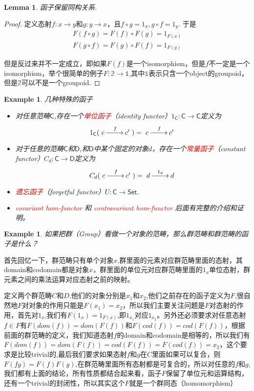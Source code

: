 \documentclass{article}
\newtheorem{lemma}[theorem]{Lemma}
\newtheorem{example}[theorem]{Example}
\newcommand*{\cat}[1]{\textsf{#1}\xspace}
\newcommand{\id}{1}
\newcommand*{\xfunc}[4]{{#2}\colon{#3}{#1}{#4}}
\newcommand*{\func}[3]{\xfunc{\to}{#1}{#2}{#3}}
\newcommand{\redt}[1]{\textcolor{red}{#1}}
\begin{document}
\begin{lemma}
\rm 函子保留同构关系.
\end{lemma}

\begin{proof}
定义态射$\func{f}{x}{y}$和$\func{g}{y}{x}$，且$f \circ g = 1_x,g \circ f=1_y$. 于是
$$
\begin{aligned}
F(f \circ g)=F(f) \circ F(g)= 1_{F(x)} \\
F(g \circ f)=F(g) \circ F(f)= 1_{F(y)}
\end{aligned}
$$

但是反过来并不一定成立，即如果$F(f)$是一个isomorphism，但是$f$不一定是一个isomorphism，举个很简单的例子$\func{F}{\mathbb{2}}{\mathbb{1}}$,其中$\mathbb{1}$表示只含一个object的groupoid，但是$\mathbb{2}$可以不是一个groupoid.
\end{proof}

\begin{example}
\rm 几种特殊的函子
	\begin{itemize}
		\item 对任意范畴$\cat{C}$,存在一个\redt{单位函子}（identity functor）$\func{\id_{\cat{C}}}{\cat{C}}{\cat{C}}$定义为\[\id_{\cat{C}}(\xymatrix{c\ar[r]^f&c'})=\xymatrix{c\ar[r]^f&c'}\]
		\item 对于任意的范畴$\cat{C}$和$\cat{D}$,和$\cat{D}$中某个固定的对象$d$，存在一个\redt{常量函子}（constant functor）$\func{C_{d}}{\cat{C}}{\cat{D}}$定义为\[C_{d}(\xymatrix{c\ar[r]^f&c'})=\xymatrix{d\ar[r]^{\id_d}&d}\]
		\item \redt{遗忘函子}（forgetful functor）$\func{U}{\cat{C}}{\cat{Set}}$.
		\item \redt{covariant hom-functor} 和 \redt{contravariant hom-functor} 后面有完整的介绍和证明。
	\end{itemize}
	
\end{example}


\begin{example}
\rm 如果把群（Group）看做一个对象的范畴，那么群范畴和群范畴的函子是什么？
\end{example}
首先回忆一下，群范畴只有单个对象$x$,群里面的元素对应群范畴里面的态射，其domain和codomain都是对象$x$，群里面的单位元对应群范畴里面的$1_x$单位态射，群元素之间的乘法运算对应态射之前的映射。

定义两个群范畴$C$和$D$,他们的对象分别是$x_1$和$x_2$,他们之前存在的函子定义为$F$,很自然地$F$对对象的作用只能是$F(x_1) = x_2$，所以我们主要关注问题是$F$对态射的作用，首先对$1_x$,我们有$F(1_x)=1_{F(x)}$,即$1_{x_1}$对应$1_{x_2}$。另外还必须要求对任意态射$f \in F$有$F(dom(f))=dom(F(f))$和$F(cod(f))=cod(F(f))$，根据前面的群范畴的定义，我们知道态射$f$的domain和codomain是相等的，所以我们有$F(dom(f))=dom(F(f))=cod(F(f))=F(cod(f))=x_2$，这个要求是比较trivial的,最后我们要求如果态射$f$和$g$在$C$里面如果可以复合，则$F(fg)=F(f)F(g)$,在群范畴里面所有态射都是可复合的，所以对任意的$f$和$g$,我们都有上面的结论，所有性质都结合起来看，函子$F$保留了单位元和运算结构，还有一个trivial的封闭性，所以其实这个$F$就是一个群同态（homomorphism）
\end{document}
